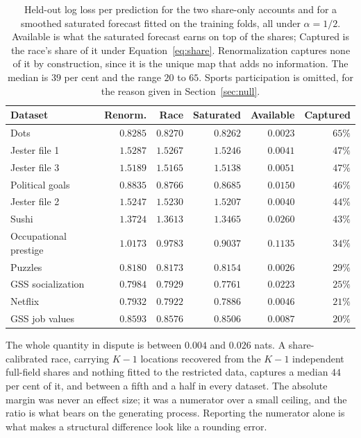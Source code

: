 \documentclass[11pt]{article}
\begin{document}
\begin{table}[ht]
\centering
\small
\begin{tabular}{lrrrrr}
\toprule
Dataset & Renorm. & Race & Saturated & Available & Captured \\
\midrule
Dots & $0.8285$ & $0.8270$ & $0.8262$ & $0.0023$ & $65\%$ \\
Jester file 1 & $1.5287$ & $1.5267$ & $1.5246$ & $0.0041$ & $47\%$ \\
Jester file 3 & $1.5189$ & $1.5165$ & $1.5138$ & $0.0051$ & $47\%$ \\
Political goals & $0.8835$ & $0.8766$ & $0.8685$ & $0.0150$ & $46\%$ \\
Jester file 2 & $1.5247$ & $1.5230$ & $1.5207$ & $0.0040$ & $44\%$ \\
Sushi & $1.3724$ & $1.3613$ & $1.3465$ & $0.0260$ & $43\%$ \\
Occupational prestige & $1.0173$ & $0.9783$ & $0.9037$ & $0.1135$ & $34\%$ \\
Puzzles & $0.8180$ & $0.8173$ & $0.8154$ & $0.0026$ & $29\%$ \\
GSS socialization & $0.7984$ & $0.7929$ & $0.7761$ & $0.0223$ & $25\%$ \\
Netflix & $0.7932$ & $0.7922$ & $0.7886$ & $0.0046$ & $21\%$ \\
GSS job values & $0.8593$ & $0.8576$ & $0.8506$ & $0.0087$ & $20\%$ \\
\bottomrule
\end{tabular}
\caption{Held-out log loss per prediction for the two share-only accounts and for a
smoothed saturated forecast fitted on the training folds, all under $\alpha = 1/2$.
Available is what the saturated forecast earns on top of the shares; Captured is the
race's share of it under Equation~\eqref{eq:share}. Renormalization captures none of
it by construction, since it is the unique map that adds no information. The median is
$39$ per cent and the range $20$ to $65$. Sports participation is omitted, for the
reason given in Section~\ref{sec:null}.}
\label{tab:ceiling}
\end{table}

The whole quantity in dispute is between $0.004$ and $0.026$ nats. A
share-calibrated race, carrying $K-1$ locations recovered from the $K-1$ independent
full-field shares and nothing fitted to the restricted data, captures a median $44$
per cent of it, and between a fifth and a half in every dataset. The absolute margin was never
an effect size; it was a numerator over a small ceiling, and the ratio is what
bears on the generating process. Reporting the numerator alone is what makes a
structural difference look like a rounding error.
\end{document}
